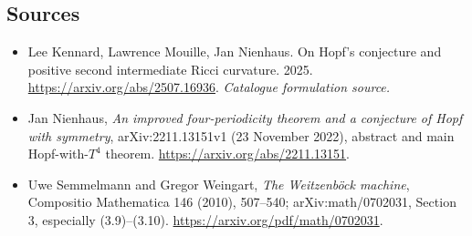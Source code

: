 \documentclass[11pt,a4paper]{article}
\begin{document}
\subsection{Sources}
\begin{itemize}\raggedright
\item[\textnormal{[S1]}]\hypertarget{source:30001953:1}{} Lee Kennard, Lawrence Mouille, Jan Nienhaus. On Hopf's conjecture and positive second intermediate Ricci curvature. 2025.
\url{https://arxiv.org/abs/2507.16936}.
{\small\textit{Catalogue formulation source.}}
\item[\textnormal{[E1]}]\hypertarget{extra:30001953:1}{} Jan Nienhaus,
\emph{An improved four-periodicity theorem and a conjecture of Hopf with symmetry},
arXiv:2211.13151v1 (23 November 2022), abstract and main Hopf-with-$T^4$ theorem.
\url{https://arxiv.org/abs/2211.13151}.
\item[\textnormal{[E2]}]\hypertarget{extra:30001953:2}{} Uwe Semmelmann and Gregor Weingart,
\emph{The Weitzenb\"ock machine}, Compositio Mathematica 146 (2010), 507--540;
arXiv:math/0702031, Section 3, especially (3.9)--(3.10).
\url{https://arxiv.org/pdf/math/0702031}.
\end{itemize}
\end{document}
